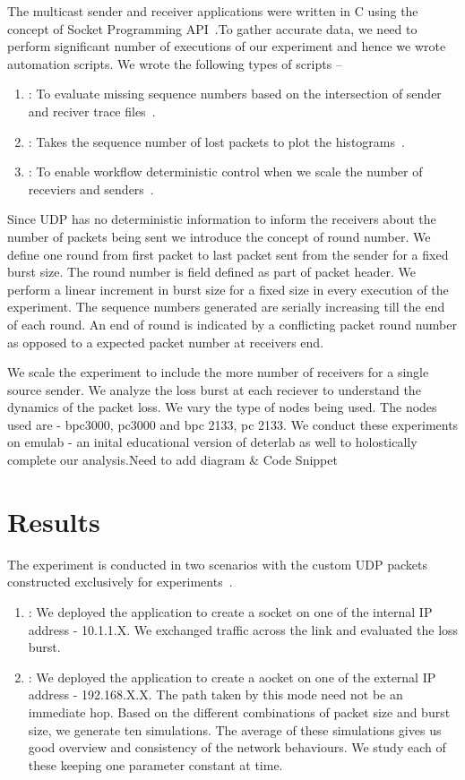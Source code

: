 \documentclass[11pt]{article}
\begin{document}
The multicast sender and receiver applications were written in C using the concept of Socket Programming API~\cite{Code}.To gather accurate data, we need to perform significant number of executions of our experiment and hence we wrote automation scripts. We wrote the following types of scripts –
\begin{enumerate}
\item {} : To evaluate missing sequence numbers based on the intersection of sender and reciver trace files~\cite{Ethtool,Netstat}.
\item {} : Takes the sequence number of lost packets to plot the histograms~\cite{Gnuplot}.
\item {} : To enable workflow deterministic control when we scale the number of receviers and senders~\cite{Magi}.
\end{enumerate}
Since UDP has no deterministic information to inform the receivers about the number of packets being sent we introduce the concept of round number. We define one round from first packet to last packet sent from the sender for a fixed burst size. The round number is field defined as part of packet header. We perform a linear increment in burst size for a fixed size in every execution of the experiment. The sequence numbers generated are serially increasing till the end of each round. An end of round is indicated by a conflicting packet round number as opposed to a expected packet number at receivers end.

We scale the experiment to include the more number of receivers for a single source sender. We analyze the loss burst at each reciever to understand the dynamics of the packet loss. We vary the type of nodes being used. The nodes used are - bpc3000, pc3000 and bpc 2133, pc 2133. 
We conduct these experiments on emulab - an inital educational version of deterlab as well to holostically complete our analysis.{Need to add diagram & Code Snippet} 
 

\section{Results}
\label{sec:evaluation}
The experiment is conducted in two scenarios with the custom UDP packets constructed exclusively for experiments~\cite{DETER}.
\begin{enumerate}
\item {} : We deployed the application to create a socket on one of the internal IP address - 10.1.1.X. We exchanged traffic across the link and evaluated the loss burst.
\item {} : We deployed the application to create a aocket on one of the external IP address - 192.168.X.X. The path taken by this mode need not be an immediate hop. Based on the different combinations of packet size and burst size, we generate ten simulations. The average of these simulations gives us good overview and consistency of the network behaviours. We study each of these keeping one parameter constant at time.
\end{enumerate}
\end{document}

